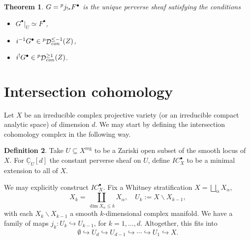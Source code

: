 \documentclass[12pt]{amsart}
\newcommand{\C}{\mathbb{C}}
\DeclareMathOperator{\D}{\mathcal{D}}
\newtheorem{theorem}{Theorem}[section]
\theoremstyle{definition}
\newtheorem{definition}[theorem]{Definition}
\theoremstyle{remark}
\numberwithin{equation}{section}
\begin{document}
\begin{theorem} \label{minimal-characterization}
    $G = \prescript{p}{}{j_{!*}} F^\bullet$ is the unique perverse sheaf 
    satisfying the conditions
    \begin{itemize}
        \item[(i)] $G^\bullet|_U \simeq F^\bullet$,
        \item[(ii)] $i^{-1} G^\bullet \in 
        \prescript{p}{}{\D}^{\leq -1}_{con}(Z)$,
        \item[(iii)] \(i^! G^\bullet \in 
        \prescript{p}{}{\D}^{\geq 1}_{con}(Z)\).
    \end{itemize}
\end{theorem}




\section{Intersection cohomology}

Let $X$ be an irreducible complex projective variety (or an irreducible compact analytic space) of dimension $d$. We may start by defining the intersection cohomology complex in the following way.
\begin{definition}
    Take $U \subseteq X^{\text{reg}}$ to be a Zariski open subset of the smooth locus of $X$. For $\underline{\C}_U[d]$ the constant perverse sheaf on $U$, define $IC_X^{\bullet}$ to be a minimal extension to all of $X$.
\end{definition}

We may explicitly construct $IC_X^{\bullet}$. Fix a Whitney stratification $X = \bigsqcup_\alpha X_{\alpha}$, 
\begin{equation}
    X_k = \coprod_{\dim X_\alpha \leq k} X_\alpha, \quad U_k := X \smallsetminus X_{k-1},
\end{equation}
with each $X_k \smallsetminus X_{k-1}$ a smooth $k$-dimensional complex manifold. We have a family of maps $j_k: U_k \hookrightarrow U_{k-1}$, for $k=1,\dots, d$. Altogether, this fits into
\begin{equation}
    \emptyset \hookrightarrow U_d \hookrightarrow U_{d-1} \hookrightarrow \cdots
    \hookrightarrow U_1 \hookrightarrow X.
\end{equation}
\end{document}
